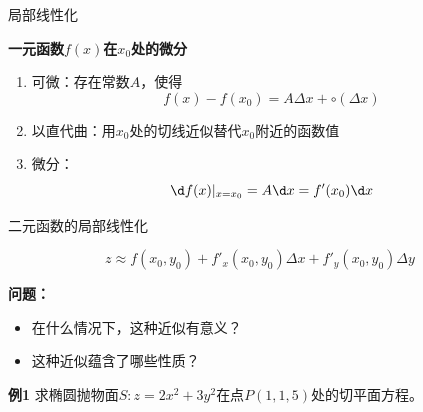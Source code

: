 \begin{frame}{局部线性化}
	\linespread{1.2}\pause 
	\begin{block}{{\bf 一元函数$f(x)$在$x_0$处的微分}\hfill}
		\begin{enumerate}\pause 
		  \item {\bb 可微：}存在常数$A$，使得
		  $$f(x)-f(x_0)=A\Delta x+\circ(\Delta x)$$\pause 
		  \vspace{-2em}
		  \item {\bb 以直代曲：}用$x_0$处的切线近似替代$x_0$附近的函数值\pause 
		  \item {\bb 微分：}
		  $$\d f(x)|_{x=x_0}=A\d x=f'(x_0)\d x$$
		  \vspace{-2em}
		\end{enumerate}
	\end{block}
\end{frame}

\begin{frame}{二元函数的局部线性化}
	\linespread{1.2}\pause 
	\pause 
	
	$$z\approx f(x_0,y_0)+f'_x(x_0,y_0)\Delta x+f'_y(x_0,y_0)\Delta y$$
	
	\pause 
	\alert{{\bf 问题：}}\pause 
	\begin{itemize}
	  \item \alert{在什么情况下，这种近似有意义？}\pause 
	  \item \alert{这种近似蕴含了哪些性质？}
	\end{itemize}
\end{frame}

\begin{frame}
	\linespread{1.2}
	\begin{exampleblock}{{\bf 例1}\hfill}
		求椭圆抛物面$S:z=2x^2+3y^2$在点$P(1,1,5)$处的切平面方程。
	\end{exampleblock}\pause 
	\begin{center}
	\end{center}
\end{frame}

